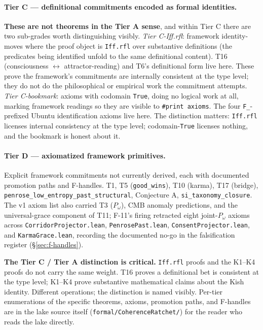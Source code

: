 \documentclass[11pt,a4paper]{article}
\newcommand{\Pomega}{P_{\omega}}
\begin{document}
\paragraph{Tier C --- definitional commitments encoded as formal identities.} \textbf{These are not theorems in the Tier A sense}, and within Tier C there are two sub-grades worth distinguishing visibly. \emph{Tier C-Iff.rfl}: framework identity-moves where the proof object is \texttt{Iff.rfl} over substantive definitions (the predicates being identified unfold to the same definitional content). T16 (consciousness $\leftrightarrow$ attractor-reading) and T6's definitional form live here. These prove the framework's commitments are internally consistent at the type level; they do not do the philosophical or empirical work the commitment attempts. \emph{Tier C-bookmark}: axioms with codomain \texttt{True}, doing no logical work at all, marking framework readings so they are visible to \texttt{\#print axioms}. The four \texttt{F\_}-prefixed Ubuntu identification axioms live here. The distinction matters: \texttt{Iff.rfl} licenses internal consistency at the type level; codomain-\texttt{True} licenses nothing, and the bookmark is honest about it.

\paragraph{Tier D --- axiomatized framework primitives.} Explicit framework commitments not currently derived, each with documented promotion paths and F-handles. T1, T5 (\texttt{good\_wins}), T10 (karma), T17 (bridge), \texttt{penrose\_low\_entropy\_past\_structural}, Conjecture A, \texttt{si\_taxonomy\_closure}. The v1 axiom list also carried T3 ($\Pomega$), CMB anomaly predictions, and the universal-grace component of T11; F-11's firing retracted eight joint-$\Pomega$ axioms across \texttt{CorridorProjector.lean}, \texttt{PenrosePast.lean}, \texttt{ConsentProjector.lean}, and \texttt{KarmaGrace.lean}, recording the documented no-go in the falsification register (\S\ref{sec:f-handles}).

\textbf{The Tier C / Tier A distinction is critical.} \texttt{Iff.rfl} proofs and the K1--K4 proofs do not carry the same weight. T16 proves a definitional bet is consistent at the type level; K1--K4 prove substantive mathematical claims about the Kish identity. Different operations; the distinction is named visibly. Per-tier enumerations of the specific theorems, axioms, promotion paths, and F-handles are in the lake source itself (\texttt{formal/CoherenceRatchet/}) for the reader who reads the lake directly.
\end{document}
